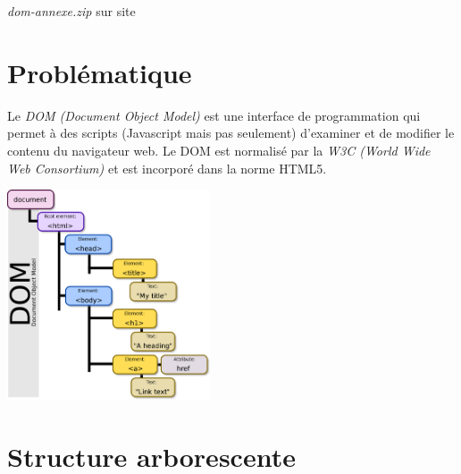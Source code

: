 \documentclass[a4paper,11pt]{article}
\begin{document}
\begin{Form}
\begin{commentprof}
\emph{dom-annexe.zip} sur site
\end{commentprof}
\section{Problématique}
Le \emph{DOM (Document Object Model)} est une interface de programmation qui permet à des scripts (Javascript mais pas seulement) d'examiner et de modifier le contenu du navigateur web. Le DOM est normalisé par la \emph{W3C (World Wide Web Consortium)} et est incorporé dans la norme HTML5. 
\begin{center}
\centering
\includegraphics[width=6cm]{ressources/dom.png}
\label{dom}
\end{center}
\begin{center}
\end{center}
\section{Structure arborescente}

\end{Form}
\end{document}
